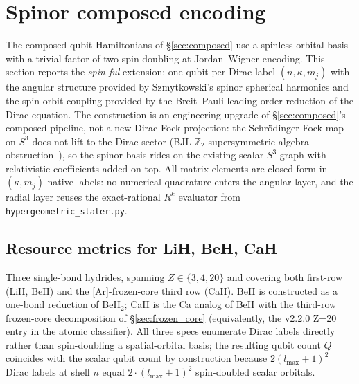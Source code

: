 
\section{Spinor composed encoding}
\label{sec:spinor_composed}

The composed qubit Hamiltonians of \S\ref{sec:composed} use a spinless
orbital basis with a trivial factor-of-two spin doubling at
Jordan--Wigner encoding. This section reports the
\emph{spin-ful} extension: one qubit per Dirac label $(n, \kappa, m_j)$
with the angular structure provided by Szmytkowski's spinor spherical
harmonics and the spin-orbit coupling provided by the Breit--Pauli
leading-order reduction of the Dirac equation.
The construction is an engineering upgrade of
\S\ref{sec:composed}'s composed pipeline, not a new Dirac Fock
projection: the Schr\"odinger Fock map on $S^3$ does not lift to the
Dirac sector (BJL $\mathbb{Z}_2$-supersymmetric algebra
obstruction~\cite{BJL}), so the spinor basis rides on the existing
scalar $S^3$ graph with relativistic coefficients added on top. All
matrix elements are closed-form in $(\kappa, m_j)$-native labels: no
numerical quadrature enters the angular layer, and the radial layer
reuses the exact-rational $R^k$ evaluator from
\texttt{hypergeometric\_slater.py}.

\subsection{Resource metrics for LiH, BeH, CaH}
\label{subsec:spinor_resource}

Three single-bond hydrides, spanning $Z \in \{3, 4, 20\}$ and covering
both first-row (LiH, BeH) and the [Ar]-frozen-core third row (CaH).
BeH is constructed as a one-bond reduction of BeH$_2$; CaH is the
Ca analog of BeH with the third-row frozen-core decomposition of
\S\ref{sec:frozen_core} (equivalently, the v2.2.0 Z=20 entry in the
atomic classifier). All three specs enumerate Dirac labels directly
rather than spin-doubling a spatial-orbital basis; the resulting
qubit count $Q$ coincides with the scalar qubit count by construction
because $2(l_{\max}+1)^2$ Dirac labels at shell $n$ equal
$2 \cdot (l_{\max}+1)^2$ spin-doubled scalar orbitals.

